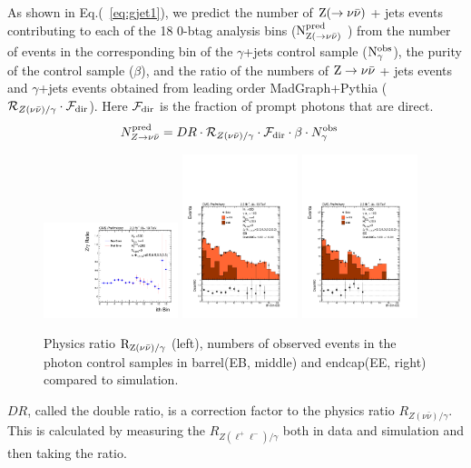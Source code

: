 As shown in Eq.(~\ref{eq:gjet1}), we predict the number of $\rm Z(\to\nu \bar{\nu})$ + jets events contributing 
to each of the 18 0-btag analysis bins ($\rm N_{Z(\to\nu \bar{\nu})}^{\rm pred}$ ) from the number of events in the corresponding 
bin of the $\gamma$+jets control sample ($\rm N_{\gamma}^{\rm obs}$), the purity of the 
control sample ($\beta$), and the ratio of the numbers of $\rm Z\to\nu \bar{\nu}$ + jets events and $\gamma$+jets events 
obtained from leading order {\sc MadGraph}+{\sc Pythia} (${\cal
  R}_{Z(\nu\bar{\nu})/\gamma} \cdot {\cal F}_{\rm dir}$).  Here ${\cal
  F}_{\rm dir}$ is the fraction of prompt photons that are direct.
\begin{align}
N_{Z\to\nu \bar{\nu}}^{\rm pred} &= DR\cdot {\cal R}_{Z(\nu\bar{\nu})/\gamma} \cdot {\cal F}_{\rm dir} \cdot \beta \cdot N_{\gamma}^{\rm obs}
\label{eq:gjet1}
\end{align}

\begin{figure}
\begin{center}
\includegraphics[width=0.35\textwidth]{ZGammaRatioWSF.pdf} %
\includegraphics[width=0.30\textwidth]{ith-Bin-EB__Data_MC_EB.pdf} %
\includegraphics[width=0.30\textwidth]{ith-Bin-EE__Data_MC_EE.pdf} %
\caption{Physics ratio $\rm R_{Z(\nu\bar{\nu})/\gamma}$ (left), numbers of observed events in the photon control samples in barrel(EB, middle) and endcap(EE, right) compared to simulation.}
\label{fig:GJdatavsmc}
\end{center}
\end{figure}
$DR$, called the double ratio, is a correction factor to the physics ratio $R_{Z(\nu\bar{\nu})/\gamma}$. This is calculated by measuring the $R_{Z(\ell^{+}{\ell^{-}})/\gamma}$ both in data and simulation and then taking the ratio.

